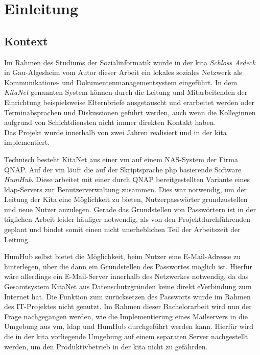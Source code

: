 
\setcounter{page}{1}

\chapter{Einleitung}
\label{sec:Einleitung}
\section{Kontext}
Im Rahmen des Studiums der Sozialinformatik wurde in der \ac{kita} \textit{Schloss Ardeck} in Gau-Algesheim vom Autor dieser Arbeit ein lokales soziales Netzwerk als Kommunikations- und Dokumentenmanagementsystem eingeführt. In dem \textit{KitaNet} genannten System können durch die Leitung und Mitarbeitenden der Einrichtung beispielsweise Elternbriefe ausgetauscht und erarbeitet werden oder Terminabsprachen und Diskussionen geführt werden, auch wenn die Kolleginnen aufgrund von Schichtdiensten nicht immer direkten Kontakt haben. \\ Das Projekt wurde innerhalb von zwei Jahren realisiert und in der \ac{kita} implementiert.

Technisch besteht KitaNet aus einer \ac{vm} auf einem NAS-System der Firma QNAP. Auf der \ac{vm} läuft die auf der Skriptsprache \ac{php} basierende Software \textit{HumHub}. Diese arbeitet mit einer durch QNAP bereitgestellten Variante eines \ac{ldap}-Servers zur Benutzerverwaltung zusammen. Dies war notwendig, um der Leitung der Kita eine Möglichkeit zu bieten, Nutzerpasswörter grundzustellen und neue Nutzer anzulegen. Gerade das Grundstellen von Passwörtern ist in der täglichen Arbeit leider häufiger notwendig, als von den Projektdurchführenden geplant und bindet somit einen nicht unerheblichen Teil der Arbeitszeit der Leitung.

HumHub selbst bietet die Möglichkeit, beim Nutzer eine E-Mail-Adresse zu hinterlegen, über die dann ein Grundstellen des Passwortes möglich ist. Hierfür wäre allerdings ein E-Mail-Server innerhalb des Netzwerkes notwendig, da das Gesamtsystem KitaNet aus Datenschutzgründen keine direkt eVerbindung zum Internet hat. Die Funktion zum zurücksetzen des Passworts wurde im Rahmen des IT-Projektes nicht genutzt. Im Rahmen dieser Bachelorarbeit wird nun der Frage nachgegangen werden, wie die Implementierung eines Mailservers in die Umgebung aus \ac{vm}, \ac{ldap} und HumHub durchgeführt werden kann. Hierfür wird die in der \ac{kita} vorliegende Umgebung auf einem separaten Server nachgestellt werden, um den Produktivbetrieb in der \ac{kita} nicht zu gefährden.

